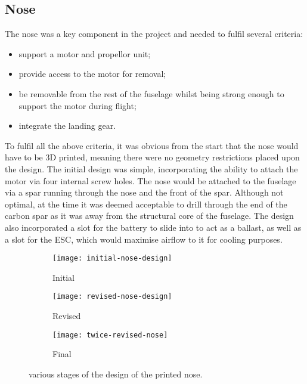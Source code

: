\documentclass[../../main.tex]{subfiles}
\begin{document}
\subsection{Nose} \label{sec:design-process:revised-design:nose}

The nose was a key component in the project and needed to fulfil several criteria:

\begin{itemize}
    \item support a motor and propellor unit;
    \item provide access to the motor for removal;
    \item be removable from the rest of the fuselage whilst being strong enough to support the motor during flight;
    \item integrate the landing gear.
\end{itemize}

To fulfil all the above criteria, it was obvious from the start that the nose would have to be 3D printed, meaning there were no geometry restrictions placed upon the design. 
The initial design was simple, incorporating the ability to attach the motor via four internal screw holes.
The nose would be attached to the fuselage via a spar running through the nose and the front of the spar.
Although not optimal, at the time it was deemed acceptable to drill through the end of the carbon spar as it was away from the structural core of the fuselage.
The design also incorporated a slot for the battery to slide into to act as a ballast, as well as a slot for the ESC, which would maximise airflow to it for cooling purposes.

\begin{figure}[H]
    \centering
    \begin{subfigure}[b]{0.6\columnwidth}
        \centering
        \texttt{[image: initial-nose-design]}
        \caption{Initial}
        \label{fig:nose-design-progression:initial}
    \end{subfigure}
    
    \begin{subfigure}[b]{0.6\columnwidth}
        \centering
        \texttt{[image: revised-nose-design]}
        \caption{Revised}
        \label{fig:nose-design-progression:revised}
    \end{subfigure}

    \begin{subfigure}[b]{0.6\columnwidth}
        \centering
        \texttt{[image: twice-revised-nose]}
        \caption{Final}
        \label{fig:nose-design-progression:final}
    \end{subfigure}
    
    \caption{various stages of the design of the printed nose.}
    \label{fig:nose-design-progression}
\end{figure} 
\end{document}
